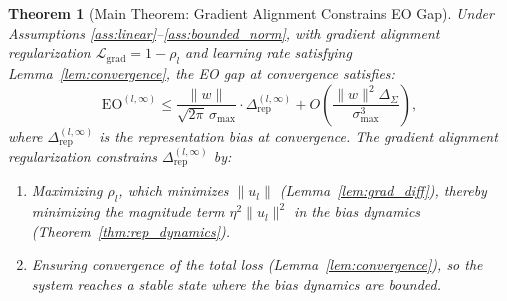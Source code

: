 \documentclass[11pt]{article}
\newtheorem{theorem}{Theorem}
\begin{document}
\begin{theorem}[Main Theorem: Gradient Alignment Constrains EO Gap]
    \label{thm:main}
    Under Assumptions \ref{ass:linear}--\ref{ass:bounded_norm}, with gradient alignment regularization $\mathcal{L}_{\mathrm{grad}} = 1 - \rho_l$ and learning rate satisfying Lemma~\ref{lem:convergence}, the EO gap at convergence satisfies:
    \begin{equation}
        \mathrm{EO}^{(l, \infty)} \leq \frac{\|w\|}{\sqrt{2\pi}\,\sigma_{\max}} \cdot \Delta_{\mathrm{rep}}^{(l, \infty)} + O\!\left(\frac{\|w\|^2 \Delta_\Sigma}{\sigma_{\max}^3}\right),
    \end{equation}
    where $\Delta_{\mathrm{rep}}^{(l, \infty)}$ is the representation bias at convergence. The gradient alignment regularization constrains $\Delta_{\mathrm{rep}}^{(l, \infty)}$ by:
    \begin{enumerate}
        \item Maximizing $\rho_l$, which minimizes $\|u_l\|$ (Lemma~\ref{lem:grad_diff}), thereby minimizing the magnitude term $\eta^2\|u_l\|^2$ in the bias dynamics (Theorem~\ref{thm:rep_dynamics}).
        \item Ensuring convergence of the total loss (Lemma~\ref{lem:convergence}), so the system reaches a stable state where the bias dynamics are bounded.
    \end{enumerate}
\end{theorem}
\end{document}
